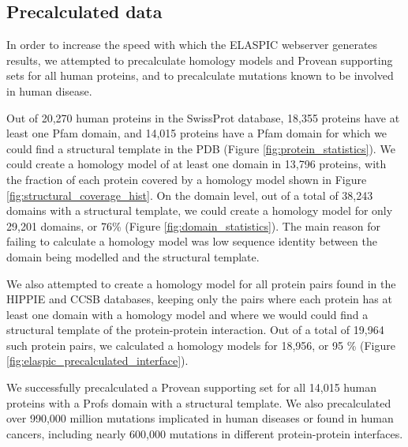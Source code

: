 \clearpage
\subsection{Precalculated data}

In order to increase the speed with which the ELASPIC webserver generates results, we attempted to precalculate homology models and Provean supporting sets for all human proteins, and to precalculate mutations known to be involved in human disease.

Out of 20,270 human proteins in the SwissProt database, 18,355 proteins have at least one Pfam domain, and 14,015 proteins have a Pfam domain for which we could find a structural template in the PDB (Figure \ref{fig:protein_statistics}). We could create a homology model of at least one domain in 13,796 proteins, with the fraction of each protein covered by a homology model shown in Figure \ref{fig:structural_coverage_hist}. On the domain level, out of a total of 38,243 domains with a structural template, we could create a homology model for only 29,201 domains, or 76\% (Figure \ref{fig:domain_statistics}). The main reason for failing to calculate a homology model was low sequence identity between the domain being modelled and the structural template.

We also attempted to create a homology model for all protein pairs found in the HIPPIE \cite{schaefer_hippie:_2012} and CCSB \cite{rolland_proteome-scale_2014} databases, keeping only the pairs where each protein has at least one domain with a homology model and where we would could find a structural template of the protein-protein interaction. Out of a total of 19,964 such protein pairs, we calculated a homology models for 18,956, or 95 \% (Figure \ref{fig:elaspic_precalculated_interface}).

We successfully precalculated a Provean supporting set for all 14,015 human proteins with a Profs domain with a structural template. We also precalculated over 990,000 million mutations implicated in human diseases or found in human cancers, including nearly 600,000 mutations in different protein-protein interfaces.



